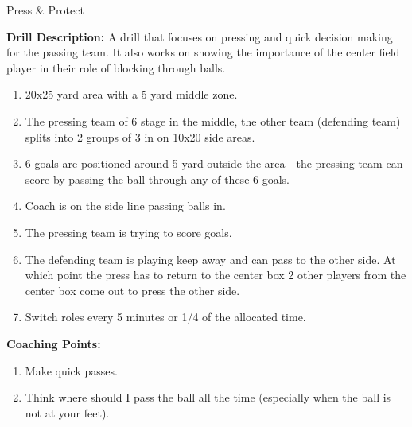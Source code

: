 \begin{evenBlock}{Press \& Protect}
\begin{minipage}[t]{\linewidth}
\begin{minipage}{.4\linewidth}
    \end{minipage}
    \hspace{0.05\linewidth}
    \begin{minipage}{.5\linewidth} %
        \textbf{Drill Description:}
        A drill that focuses on pressing and quick decision making for the passing team.  It also works on showing the importance of the center field player in their role of blocking through balls.
        
        \begin{enumerate}
        \setlength{\itemsep}{0pt}
        \setlength{\parskip}{0pt}
        \setlength{\parsep}{0pt}
        \item 20x25 yard area with a 5 yard middle zone.
        \item The pressing team of 6 stage in the middle, the other team (defending team) splits into 2 groups of 3 in on 10x20 side areas.
        \item 6 goals are positioned around 5 yard outside the area - the pressing team can score by passing the ball through any of these 6 goals.
        \item Coach is on the side line passing balls in.
        \item The pressing team is trying to score goals.
        \item The defending team is playing keep away and can pass to the other side.  At which point the press has to return to the center box 2 other players from the center box come out to press the other side.
        \item Switch roles every 5 minutes or 1/4 of the allocated time.
        \end{enumerate}

        \textbf{Coaching Points:}
        \begin{enumerate}
        \setlength{\itemsep}{0pt}
        \setlength{\parskip}{0pt}
        \setlength{\parsep}{0pt}
        \item Make quick passes.
        \item Think where should I pass the ball all the time (especially when the ball is not at your feet).
        \end{enumerate}
    \end{minipage}
\end{minipage}

\end{evenBlock}